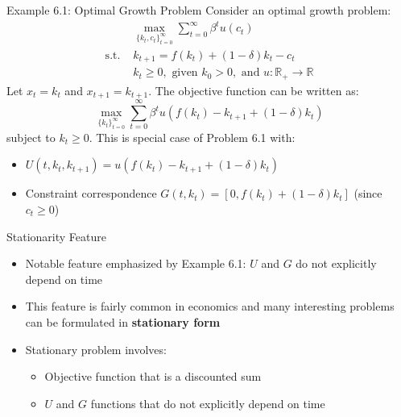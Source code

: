 \documentclass[9pt,aspectratio=169]{beamer}
\newcommand{\R}{\mathbb{R}}
\begin{document}

\begin{frame}{Example 6.1: Optimal Growth Problem}
Consider an optimal growth problem:
\begin{align*}
&\max_{\{k_t,c_t\}_{t=0}^{\infty}} \sum_{t=0}^{\infty} \beta^t u(c_t)\\
\text{s.t. } &k_{t+1} = f(k_t) + (1-\delta)k_t - c_t\\
&k_t \geq 0, \text{ given } k_0 > 0, \text{ and } u: \R_+ \to \R
\end{align*}
Let $x_t = k_t$ and $x_{t+1} = k_{t+1}$. The objective function can be
written as:
\begin{equation*}
\max_{\{k_t\}_{t=0}^{\infty}} \sum_{t=0}^{\infty} \beta^t u(f(k_t) - k_{t+1} + (1-\delta)k_t)
\end{equation*}
subject to $k_t \geq 0$. This is special case of Problem 6.1 with:
\begin{itemize}
\item $U(t, k_t, k_{t+1}) = u(f(k_t) - k_{t+1} + (1-\delta)k_t)$
\item Constraint correspondence $G(t, k_t) = [0, f(k_t) + (1-\delta)k_t]$ (since $c_t \geq 0$)
\end{itemize}
\end{frame}

\begin{frame}{Stationarity Feature}
\begin{itemize}
    \item Notable feature emphasized by Example 6.1: $U$ and $G$ do not
    explicitly depend on time
    \item This feature is fairly common in economics and many interesting
    problems can be formulated in \textbf{stationary form}
    \item Stationary problem involves:
    \begin{itemize}
        \item Objective function that is a discounted sum
        \item $U$ and $G$ functions that do not explicitly depend on time
    \end{itemize}
\end{itemize}
\end{frame}
\end{document}
